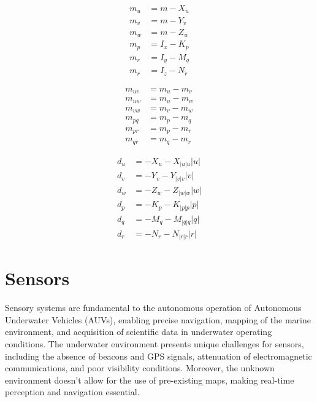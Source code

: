 \begin{minipage}[t]{0.3\textwidth}
\begin{align*}
    m_u &= m - X_{\dot{u}} \\
    m_v &= m - Y_{\dot{v}} \\
    m_w &= m - Z_{\dot{w}} \\
    m_p &= I_x - K_{\dot{p}} \\
    m_r &= I_y - M_{\dot{q}} \\
    m_r &= I_z - N_{\dot{r}}
\end{align*}
\end{minipage}
\hfill
\begin{minipage}[t]{0.3\textwidth}
\begin{align*}
    m_{uv} &= m_u - m_v \\
    m_{uw} &= m_u - m_w \\
    m_{vw} &= m_v - m_w \\
    m_{pq} &= m_p - m_q \\
    m_{pr} &= m_p - m_r \\
    m_{qr} &= m_q - m_r
\end{align*}
\end{minipage}
\hfill
\begin{minipage}[t]{0.3\textwidth}
\begin{align*}
    d_u &= -X_u - X_{|u|u}|u| \\
    d_v &= -Y_v - Y_{|v|v}|v| \\
    d_w &= -Z_w - Z_{|w|w}|w| \\
    d_p &= -K_p - K_{|p|p}|p| \\
    d_q &= -M_q - M_{|q|q}|q| \\
    d_r &= -N_r - N_{|r|r}|r|
\end{align*}
\end{minipage}


\section{Sensors}
Sensory systems are fundamental to the autonomous operation of Autonomous Underwater Vehicles (AUVs), enabling precise navigation, 
mapping of the marine environment, and acquisition of scientific data in underwater operating conditions. The underwater 
environment presents unique challenges for sensors, including the absence of beacons and GPS signals, attenuation of electromagnetic 
communications, and poor visibility conditions. Moreover, the unknown environment doesn't allow for the use of pre-existing maps, 
making real-time perception and navigation essential.

